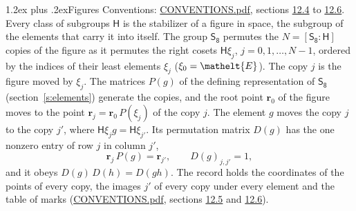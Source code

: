 \documentclass[10pt,a4paper]{article}
\makeatletter
\renewcommand\section{\@startsection{section}{1}{\z@}{-3ex plus -1ex minus -.2ex}%
  {1.2ex plus .2ex}{\normalfont\large\sffamily\bfseries\color{parttitle}}}
\numberwithin{equation}{section}
\newcommand{\eltfont}[1]{{\let\sigma\eltsigma\mathelt{#1}}}
\newcommand{\grp}[1]{\mathsf{#1}}
\newcommand{\cls}[1]{\eltfont{#1}}
\newcommand{\pointr}{\mathbf{r}}
\makeatother
\begin{document}
\section{Figures}\label{s:permutation}
Conventions: \href{../../CONVENTIONS.pdf}{CONVENTIONS.pdf}, sections \href{../../CONVENTIONS.pdf\#conv.12.4}{12.4} to \href{../../CONVENTIONS.pdf\#conv.12.6}{12.6}.
Every class of subgroups $\grp{H}$ is the stabilizer of a figure in space, the subgroup of the elements that carry it into itself. \label{n:local.orbit.size}\label{n:element.coset.least}\label{n:index.coset}The group $\grp{S_{8}}$ permutes the $N = [\grp{S_{8}} : \grp{H}]$ copies of the figure as it permutes the right cosets $\grp{H}\xi_j$, $j = 0, 1, \dots, N - 1$, ordered by the indices of their least elements $\xi_j$ ($\xi_0 = \cls{E}$). The copy $j$ is the figure moved by $\xi_j$. The matrices $P(g)$ of the defining representation of $\grp{S_{8}}$ (section~\ref{s:elements}) generate the copies, and the root point $\pointr_0$ of the figure moves to the point $\pointr_j = \pointr_0\, P(\xi_j)$ of the copy $j$. \label{n:local.coset.image}The element $g$ moves the copy $j$ to the copy $j'$, where $\grp{H}\xi_j g = \grp{H}\xi_{j'}$. \label{n:local.matrix.permutation}Its permutation matrix $D(g)$ has the one nonzero entry of row $j$ in column $j'$,
\begin{equation}\label{e:perm.matrix}\pointr_j\, P(g) = \pointr_{j'}, \qquad D(g)_{j,j'} = 1,\end{equation}
and it obeys $D(g)\, D(h) = D(gh)$. The record holds the coordinates of the points of every copy, the images $j'$ of every copy under every element and the table of marks (\href{../../CONVENTIONS.pdf}{CONVENTIONS.pdf}, sections \href{../../CONVENTIONS.pdf\#conv.12.5}{12.5} and \href{../../CONVENTIONS.pdf\#conv.12.6}{12.6}).
\end{document}

